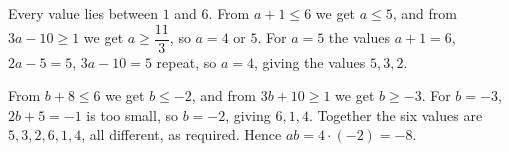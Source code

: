 Every value lies between $1$ and $6$. From $a+1\le6$ we get $a\le5$, and from $3a-10\ge1$ we get $a\ge\dfrac{11}{3}$, so $a=4$ or $5$. For $a=5$ the values $a+1=6$, $2a-5=5$, $3a-10=5$ repeat, so $a=4$, giving the values $5,3,2$.

From $b+8\le6$ we get $b\le-2$, and from $3b+10\ge1$ we get $b\ge-3$. For $b=-3$, $2b+5=-1$ is too small, so $b=-2$, giving $6,1,4$. Together the six values are $5,3,2,6,1,4$, all different, as required. Hence $ab=4\cdot(-2)=\boxed{-8}$.
